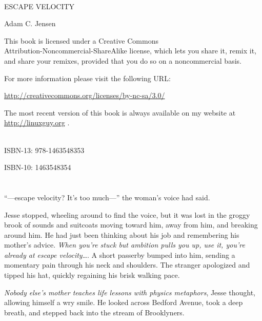 \documentclass[12pt]{book}
\begin{document}
\thispagestyle{empty}
~\\
\vspace{2in}
\begin{center}
\LARGE{ESCAPE VELOCITY}

\vspace{1in}
\large{Adam C. Jensen}
\end{center}

\newpage

{\small
\noindent This book is licensed under a Creative Commons \\Attribution-Noncommercial-ShareAlike license, which lets you share it, remix it, and share your remixes, provided that you do so on a noncommercial basis.

For more information please visit the following URL:

\noindent \url{http://creativecommons.org/licenses/by-nc-sa/3.0/}

The most recent version of this book is always available on my website at \url{http://linuxguy.org} .

~\\
\noindent ISBN-13: 978-1463548353 

\noindent ISBN-10: 1463548354
}

\chapter{}

``---escape velocity?  It's too much---'' the woman's voice had said.

Jesse stopped, wheeling around to find the voice, but it was lost in the groggy brook of sounds and suitcoats moving toward him, away from him, and breaking around him.  He had just been thinking about his job and remembering his mother's advice.  \emph{When you're stuck but ambition pulls you up, use it, you're already at escape velocity}\dots.  A short passerby bumped into him, sending a momentary pain through his neck and shoulders.  The stranger apologized and tipped his hat, quickly regaining his brisk walking pace.

\emph{Nobody else's mother teaches life lessons with physics metaphors}, Jesse thought, allowing himself a wry smile.  He looked across Bedford Avenue, took a deep breath, and stepped back into the stream of Brooklyners.

\chapter{}
\end{document}
